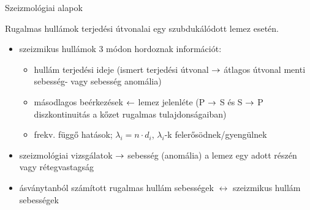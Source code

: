 \documentclass{beamer}
\begin{document}
\begin{frame}{Szeizmológiai alapok}
    \begin{minipage}[c]{0.38\textwidth}
        \centering
        
        Rugalmas hullámok terjedési útvonalai egy szubdukálódott lemez esetén. \cite{helffrich}
    \end{minipage}
    \begin{minipage}[c]{0.525\textwidth}
        \begin{itemize}
            \item szeizmikus hullámok 3 módon hordoznak információt:
            \begin{itemize}
                \item hullám terjedési ideje (ismert terjedési útvonal $\rightarrow$ átlagos útvonal menti sebesség- vagy sebesség anomália)
                \item másodlagos beérkezések $\leftarrow$ lemez jelenléte (P $\rightarrow$ S és S $\rightarrow$ P diszkontinuitás a kőzet rugalmas tulajdonságaiban)
                \item frekv. függő hatások; $\lambda_i = n \cdot d_i$, $\lambda_i$-k felerősödnek/gyengülnek
            \end{itemize}
            \item szeizmológiai vizsgálatok $\rightarrow$ sebesség (anomália) a lemez egy adott részén vagy rétegvastagság
            \item ásványtanból számított rugalmas hullám sebességek $\leftrightarrow$ szeizmikus hullám sebességek
        \end{itemize}
    \end{minipage}
\end{frame}


\end{document}
